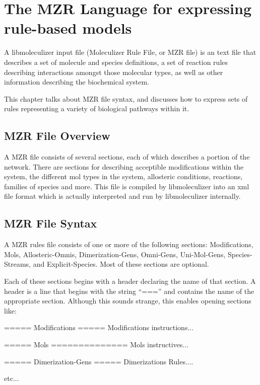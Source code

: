 \chapter{The MZR Language for expressing rule-based models}
\label{chap:theRulesChapter}
A libmoleculizer input file (Moleculizer Rule File, or MZR
file) is an text file that describes a set of molecule and species
definitions, a set of reaction rules describing interactions amongst
those molecular types, as well as other information describing the
biochemical system.

This chapter talks about MZR file syntax, and discusses how to express
sets of rules representing a variety of biological pathways within
it.  

\section{MZR File Overview}

A MZR file consists of several sections, each of which describes a
portion of the network.  There are sections for describing acceptible
modifications within the system, the different mol types in the
system, allosteric conditions, reactions, families of species and
more.  This file is compiled by libmoleculizer into an xml file format
which is actually interpreted and run by libmoleculizer internally.  




\section{MZR File Syntax}
A MZR rules file consists of one or more of the following sections:
Modifications, Mols, Allosteric-Omnis, Dimerization-Gens, Omni-Gens,
Uni-Mol-Gens, Species-Streams, and Explicit-Species.  Most of these
sections are optional.

Each of these sections begins with a header declaring the name of that
section.  A header is a line that begins with the string ``==='' and
contains the name of the appropriate section.  Although this sounds
strange, this enables opening sections like:

\begin{ExampleXML}
===== Modifications =====
  Modifications instructions...

===== Mols ==============
  Mols instructives...

=====  Dimerization-Gens =====
  Dimerizations Rules....

etc...

\end{ExampleXML}

